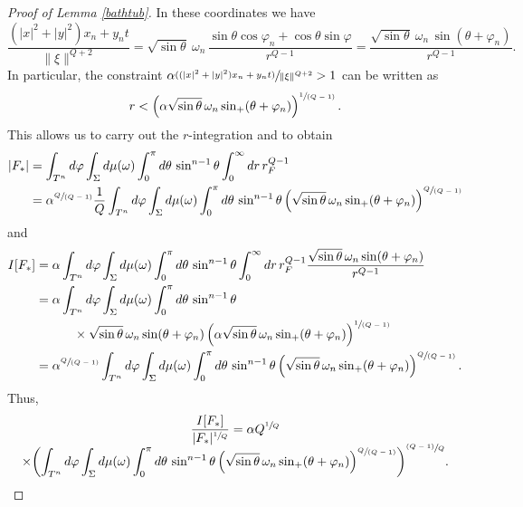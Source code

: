 \documentclass[11pt]{article}
\let\oldsfrac\sfrac
\renewcommand{\sfrac}[2]{{\oldsfrac{#1}{#2}}}
\newcommand{\psfrac}[2]{{\sfrac{(#1)}{#2}}}
\newcommand{\spfrac}[2]{{\sfrac{#1}{(#2)}}}
\theoremstyle{definition}
\let\phi\varphi
\newcommand{\1}{\mathbbm{1}}
\numberwithin{equation}{section}
\begin{document}
\begin{proof}[Proof of Lemma \ref{bathtub}]
In these coordinates we have
\[
\frac{(|x|^2+|y|^2)x_n + y_n t}{\|\xi\|^{Q+2}} = \sqrt{\sin\theta}\ \omega_n\,\frac{\sin\theta \cos\phi_n + \cos\theta \sin\phi}{r^{Q-1}} = \frac{\sqrt{\sin\theta}\ \omega_n\,\sin(\theta+\phi_n)}{r^{Q-1}}.
\]
In particular, the constraint $\alpha \psfrac{(|x|^2+|y|^2)x_n + y_n t}{\|\xi\|^{Q+2}}>1$ can be written as
\[
r< \left(\alpha \sqrt{ \sin\theta}\,\omega_n \sin_+(\theta+\phi_n)\right)^\spfrac{1}{Q-1}.
\]
This allows us to carry out the $r$-integration and to obtain
\begin{align*}
|F_*| & = \int_{T^n} d\phi \int_\Sigma d\mu(\omega) \int_0^\pi d\theta \,\sin^{n-1}\theta
\int_0^\infty dr \,r^{Q-1} \1_F \\
& = \alpha^\spfrac{Q}{Q-1} \frac1Q \int_{T^n} d\phi \int_\Sigma d\mu(\omega) \int_0^\pi d\theta \,\sin^{n-1}\theta \left(\sqrt{ \sin\theta}\,\omega_n \sin_+(\theta+\phi_n)\right)^\spfrac{Q}{Q-1}
\end{align*}
and
\begin{align*}
I[F_*] & = \alpha \int_{T^n} d\phi \int_\Sigma d\mu(\omega) \int_0^\pi d\theta \,\sin^{n-1}\theta \int_0^\infty dr \,r^{Q-1} \1_F \frac{\sqrt{\sin\theta}\,\omega_n \sin(\theta+\phi_n)}{r^{Q-1}} \\
& = \alpha \int_{T^n} d\phi \int_\Sigma d\mu(\omega) \int_0^\pi d\theta \,\sin^{n-1}\theta \\
& \quad\quad\quad \times \sqrt{\sin\theta}\,\omega_n \sin(\theta+\phi_n)
\left(\alpha \sqrt{ \sin\theta}\,\omega_n \sin_+(\theta+\phi_n)\right)^\spfrac{1}{Q-1} \\
& = \alpha^\spfrac{Q}{Q-1} \int_{T^n} d\phi \int_\Sigma d\mu(\omega) \int_0^\pi d\theta \,\sin^{n-1}\theta \left(\sqrt{ \sin\theta}\,\omega_n \sin_+(\theta+\phi_n)\right)^\spfrac{Q}{Q-1}.
\end{align*}
Thus,
\begin{multline*}
\frac{I[F_*]}{|F_*|^\sfrac1Q} = \alpha Q^\sfrac1Q\\[-5pt]
\times \biggl(\int_{T^n} d\phi \int_\Sigma d\mu(\omega) \int_0^\pi d\theta \,\sin^{n-1}\theta \left(\sqrt{ \sin\theta}\,\omega_n \sin_+(\theta+\phi_n)\right)^\spfrac{Q}{Q-1}\biggr)^\psfrac{Q-1}{Q}.
\end{multline*}


\end{proof}
\end{document}
